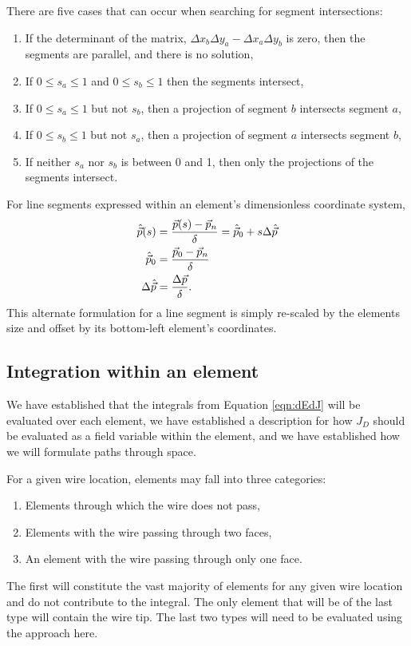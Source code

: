 There are five cases that can occur when searching for segment intersections:
\begin{enumerate}
\item If the determinant of the matrix, $\Delta x_b \Delta y_a - \Delta x_a \Delta y_b$ is zero, then the segments are parallel, and there is no solution,
\item If $0 \le s_a \le 1$ and $0 \le s_b \le 1$ then the segments intersect,
\item If $0 \le s_a \le 1$ but not $s_b$, then a projection of segment $b$ intersects segment $a$,
\item If $0 \le s_b \le 1$ but not $s_a$, then a projection of segment $a$ intersects segment $b$,
\item If neither $s_a$ nor $s_b$ is between 0 and 1, then only the projections of the segments intersect.
\end{enumerate}

For line segments expressed within an element's dimensionless coordinate system,
\begin{align}
\hat{\vec{p}}(s) &= \frac{\vec{p}(s) - \vec{p}_n}{\delta} = \hat{\vec{p}}_0 + s\Delta \hat{\vec{p}}\\
\hat{\vec{p}}_0 &= \frac{\vec{p}_0 - \vec{p}_n}{\delta}\nonumber\\
\Delta \hat{\vec{p}} &= \frac{\Delta \vec{p}}{\delta}\nonumber.
\end{align}
This alternate formulation for a line segment is simply re-scaled by the elements size and offset by its bottom-left element's coordinates.

\subsection{Integration within an element}\label{sec:element}

We have established that the integrals from Equation \ref{eqn:dEdJ} will be evaluated over each element, we have established a description for how $J_D$ should be evaluated as a field variable within the element, and we have established how we will formulate paths through space.

For a given wire location, elements may fall into three categories:
\begin{enumerate}
\item Elements through which the wire does not pass,
\item Elements with the wire passing through two faces,
\item An element with the wire passing through only one face.
\end{enumerate}
The first will constitute the vast majority of elements for any given wire location and do not contribute to the integral.  The only element that will be of the last type will contain the wire tip.  The last two types will need to be evaluated using the approach here.

